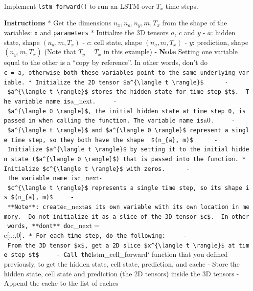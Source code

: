 \documentclass[11pt]{article}
\begin{document}
Implement \texttt{lstm\_forward()} to run an LSTM over \(T_x\) time
steps.

\textbf{Instructions} * Get the dimensions \(n_x, n_a, n_y, m, T_x\)
from the shape of the variables: \texttt{x} and \texttt{parameters} *
Initialize the 3D tensors \(a\), \(c\) and \(y\) - \(a\): hidden state,
shape \((n_{a}, m, T_{x})\) - \(c\): cell state, shape
\((n_{a}, m, T_{x})\) - \(y\): prediction, shape \((n_{y}, m, T_{x})\)
(Note that \(T_{y} = T_{x}\) in this example) - \textbf{Note} Setting
one variable equal to the other is a ``copy by reference''. In other
words, don't do
\texttt{c\ =\ a\textquotesingle{},\ otherwise\ both\ these\ variables\ point\ to\ the\ same\ underlying\ variable.\ *\ Initialize\ the\ 2D\ tensor\ \$a\^{}\{\textbackslash{}langle\ t\ \textbackslash{}rangle\}\$\ \ \ \ \ \ -\ \$a\^{}\{\textbackslash{}langle\ t\ \textbackslash{}rangle\}\$\ stores\ the\ hidden\ state\ for\ time\ step\ \$t\$.\ \ The\ variable\ name\ is}a\_next\texttt{.\ \ \ \ \ -\ \$a\^{}\{\textbackslash{}langle\ 0\ \textbackslash{}rangle\}\$,\ the\ initial\ hidden\ state\ at\ time\ step\ 0,\ is\ passed\ in\ when\ calling\ the\ function.\ The\ variable\ name\ is}a0\texttt{.\ \ \ \ \ -\ \$a\^{}\{\textbackslash{}langle\ t\ \textbackslash{}rangle\}\$\ and\ \$a\^{}\{\textbackslash{}langle\ 0\ \textbackslash{}rangle\}\$\ represent\ a\ single\ time\ step,\ so\ they\ both\ have\ the\ shape\ \ \$(n\_\{a\},\ m)\$\ \ \ \ \ \ -\ Initialize\ \$a\^{}\{\textbackslash{}langle\ t\ \textbackslash{}rangle\}\$\ by\ setting\ it\ to\ the\ initial\ hidden\ state\ (\$a\^{}\{\textbackslash{}langle\ 0\ \textbackslash{}rangle\}\$)\ that\ is\ passed\ into\ the\ function.\ *\ Initialize\ \$c\^{}\{\textbackslash{}langle\ t\ \textbackslash{}rangle\}\$\ with\ zeros.\ \ \ \ \ \ -\ The\ variable\ name\ is}c\_next\texttt{-\ \$c\^{}\{\textbackslash{}langle\ t\ \textbackslash{}rangle\}\$\ represents\ a\ single\ time\ step,\ so\ its\ shape\ is\ \$(n\_\{a\},\ m)\$\ \ \ \ \ -\ **Note**:\ create}c\_next\texttt{as\ its\ own\ variable\ with\ its\ own\ location\ in\ memory.\ \ Do\ not\ initialize\ it\ as\ a\ slice\ of\ the\ 3D\ tensor\ \$c\$.\ \ In\ other\ words,\ **don\textquotesingle{}t**\ do}c\_next
=
c{[}:,:,0{]}\texttt{.\ *\ For\ each\ time\ step,\ do\ the\ following:\ \ \ \ \ -\ From\ the\ 3D\ tensor\ \$x\$,\ get\ a\ 2D\ slice\ \$x\^{}\{\textbackslash{}langle\ t\ \textbackslash{}rangle\}\$\ at\ time\ step\ \$t\$\ \ \ \ \ -\ Call\ the}lstm\_cell\_forward`
function that you defined previously, to get the hidden state, cell
state, prediction, and cache - Store the hidden state, cell state and
prediction (the 2D tensors) inside the 3D tensors - Append the cache to
the list of caches
\end{document}
